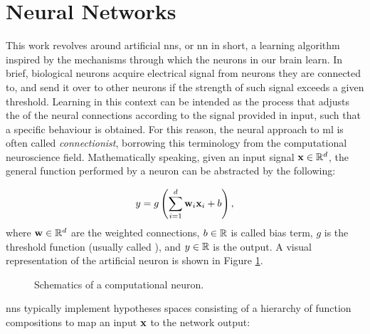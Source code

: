 \section{Neural Networks}\label{sec:nn}
This work revolves around artificial \glspl{nn}, or \gls{nn} in short,
a learning algorithm inspired by the mechanisms through which the neurons
in our brain learn. In brief, biological neurons acquire electrical signal
from neurons they are connected to, and send it over to other neurons if
the strength of such signal exceeds a given threshold. Learning in this
context can be intended as the process that adjusts the 
of the neural connections according to the signal provided in input, such
that a specific behaviour is obtained. For this reason, the neural approach
to \gls{ml} is often called \emph{connectionist}, borrowing this terminology
from the computational neuroscience field. Mathematically speaking, given an input signal $\Vector{x} \in \Real^d$, the general function performed by a neuron can be abstracted by the following:

$$y = g\Paren{\sum_{i=1}^d \Vector{w}_{i}\Vector{x}_i + b},$$
where $\Vector{w} \in \Real^d$ are the weighted connections, $b \in \mathbb{R}$ is called bias term,
$g$ is the threshold function (usually called ),
and $y \in \mathbb{R}$ is the output. A visual representation of the
artificial neuron is shown in Figure \ref{fig:neuron}.
\begin{figure}[t!]
    \centering
    \resizebox{.4\textwidth}{!}{}
    \caption{Schematics of a computational neuron.}
    \label{fig:neuron}
\end{figure}
\glspl{nn} typically implement hypotheses spaces consisting of a hierarchy
of function compositions to map an input $\Vector{x}$ to the network output:

